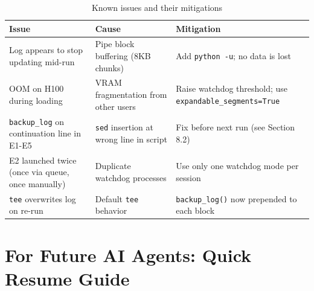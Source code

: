 \documentclass[12pt, a4paper]{article}
\begin{document}
\begin{table}[H]
\centering
\caption{Known issues and their mitigations}
\begin{tabular}{@{}p{5cm}p{4cm}p{4.5cm}@{}}
\toprule
\textbf{Issue} & \textbf{Cause} & \textbf{Mitigation} \\
\midrule
Log appears to stop updating mid-run & Pipe block buffering (8KB chunks) & Add \texttt{python -u}; no data is lost \\
OOM on H100 during loading & VRAM fragmentation from other users & Raise watchdog threshold; use \texttt{expandable\_segments=True} \\
\texttt{backup\_log} on continuation line in E1-E5 & \texttt{sed} insertion at wrong line in script & Fix before next run (see Section 8.2) \\
E2 launched twice (once via queue, once manually) & Duplicate watchdog processes & Use only one watchdog mode per session \\
\texttt{tee} overwrites log on re-run & Default \texttt{tee} behavior & \texttt{backup\_log()} now prepended to each block \\
\bottomrule
\end{tabular}
\end{table}

\section{For Future AI Agents: Quick Resume Guide}
\end{document}
